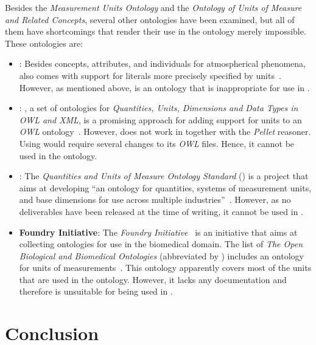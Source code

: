 Besides the \emph{Measurement Units Ontology} and the \emph{Ontology of Units of Measure and Related Concepts}, several other ontologies have been examined, but all of them have shortcomings that render their use in the \smarthomeweather ontology merely impossible. These ontologies are:

\begin{itemize}
  \item \textbf{}: Besides concepts, attributes, and individuals for atmospherical phenomena,  also comes with support for literals more precisely specified by units~\cite{SWEET1}. However, as mentioned above,  is an ontology that is inappropriate for use in \smarthomeweather.
  
  \item \textbf{}: , a set of ontologies for \emph{Quantities, Units, Dimensions and Data Types in OWL and XML}, is a promising approach for adding support for units to an \emph{OWL} ontology~\cite{QUDT}. However,  does not work in \protege together with the \emph{Pellet} reasoner. Using  would require several changes to its \emph{OWL} files. Hence, it cannot be used in the \smarthomeweather ontology.
  
  \item \textbf{}: The \emph{ Quantities and Units of Measure Ontology Standard} () is a project that aims at developing ``an ontology for quantities, systems of measurement units, and base dimensions for use across multiple industries''~\cite{QUOMOS}. However, as no deliverables have been released at the time of writing, it cannot be used in \smarthomeweather.
  
  \item \textbf{ Foundry Initiative}: The \emph{ Foundry Initiative}~\cite{OBOFoundry} is an initiative that aims at collecting ontologies for use in the biomedical domain. The list of \emph{The Open Biological and Biomedical Ontologies} (abbreviated by ) includes an ontology for units of measurements~\cite{OBOUnits1,OBOUnits2}. This ontology apparently covers most of the units that are used in the \smarthomeweather ontology. However, it lacks any documentation and therefore is unsuitable for being used in \smarthomeweather.
\end{itemize}

\section{Conclusion}

